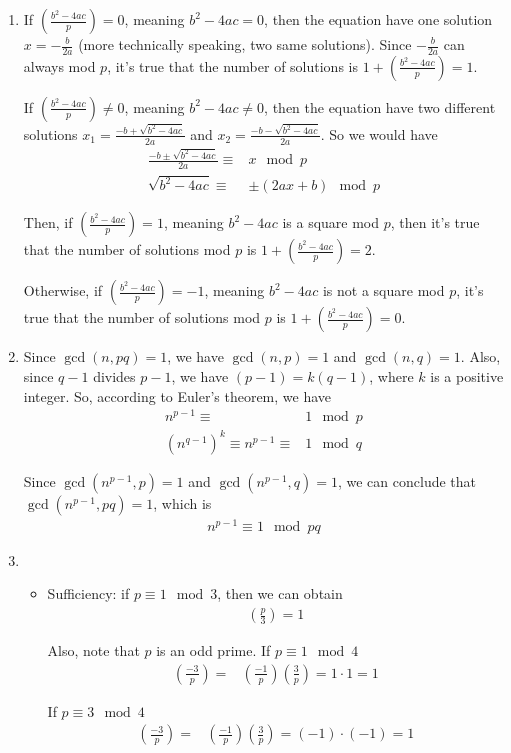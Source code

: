 \documentclass[11pt,a4paper]{article}
\begin{document}
\begin{enumerate}
\item If $\left(\frac{b^{2}-4ac}{p}\right) = 0$, meaning $b^{2}-4ac = 0$, then the equation have one solution $x = -\frac{b}{2a}$ (more technically speaking, two same solutions). Since $-\frac{b}{2a}$ can always mod $p$, it's true that the number of solutions is $1 + \left(\frac{b^{2}-4ac}{p}\right) = 1$.
\par If $\left(\frac{b^{2}-4ac}{p}\right) \neq 0$, meaning $b^{2}-4ac \neq 0$, then the equation have two different solutions $x_{1} = \frac{-b+\sqrt{b^{2}-4ac}}{2a}$ and $x_{2} = \frac{-b-\sqrt{b^{2}-4ac}}{2a}$. So we would have
\begin{align*}
	\frac{-b\pm\sqrt{b^{2}- 4ac}}{2a} \equiv& x \mod p \\
	\sqrt{b^{2}-4ac} \equiv& \pm(2ax+b) \mod p
\end{align*}
\par Then, if $\left(\frac{b^{2}-4ac}{p}\right) = 1$, meaning $b^{2}-4ac$ is a square mod $p$, then it's true that the number of solutions mod $p$ is $1+\left(\frac{b^{2}-4ac}{p}\right) = 2$.
\par Otherwise, if $\left(\frac{b^{2}-4ac}{p}\right) = -1$, meaning $b^{2}-4ac$ is not a square mod $p$, it's true that the number of solutions mod $p$ is $1+\left(\frac{b^{2}-4ac}{p}\right) = 0$.

\item Since $\gcd(n, pq) = 1$, we have $\gcd(n,p) = 1$ and $\gcd(n,q) = 1$. Also, since $q-1$ divides $p-1$, we have $(p-1) = k(q-1)$, where $k$ is a positive integer. So, according to Euler's theorem, we have
\begin{align*}
	n^{p-1} \equiv& 1 \mod p \\
	(n^{q-1})^{k} \equiv n^{p-1} \equiv& 1 \mod q
\end{align*}
\par Since $\gcd(n^{p-1}, p) = 1$ and $\gcd(n^{p-1}, q) = 1$, we can conclude that $\gcd(n^{p-1}, pq) = 1$, which is
\begin{align*}
	n^{p-1} \equiv 1 \mod pq
\end{align*}

\item \begin{itemize}
\item Sufficiency: if $p \equiv 1 \mod 3$, then we can obtain
\begin{align*}
	\left(\frac{p}{3}\right) = 1
\end{align*}
\par Also, note that $p$ is an odd prime. If $p \equiv 1 \mod 4$
\begin{align*}
	\left(\frac{-3}{p}\right) =& \left(\frac{-1}{p}\right)\left(\frac{3}{p}\right) = 1 \cdot 1 = 1
\end{align*}
\par If $p \equiv 3 \mod 4$
\begin{align*}
	\left(\frac{-3}{p}\right) =& \left(\frac{-1}{p}\right)\left(\frac{3}{p}\right) = (-1) \cdot (-1) = 1
\end{align*}


\end{itemize}
\end{enumerate}
\end{document}
